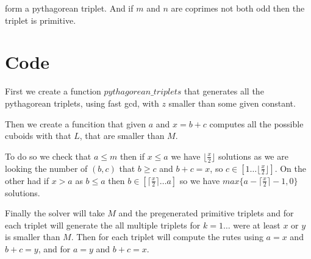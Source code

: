 \documentclass[10pt, a4paper]{article}		%
\theoremstyle{plain}
\theoremstyle{definition}
\begin{document}
form a pythagorean triplet. And if $m$ and $n$ are coprimes not both odd then the triplet is primitive.

\section{Code}

First we create a function $pythagorean\_triplets$ that generates all the pythagorean triplets, using fast gcd, with $z$ smaller than some given constant.

Then we create a funcition that given $a$ and $x = b + c$ computes all the possible cuboids with that $L$, that are smaller than $M$.

To do so we check that $a \leq m$ then if $x \leq a$ we have $\lfloor\frac{x}{2}\rfloor$ solutions as we are looking the number of $(b,c)$ that $b \geq c$ and $b+c = x$, so $c \in [1 \dots \lfloor\frac{x}{2}\rfloor]$.
On the other had if $x > a$ as $b \leq a$ then $b \in [\lceil\frac{x}{2}\rceil \dots a]$ so we have $max\{a - \lceil\frac{x}{2}\rceil - 1, 0\}$ solutions.

Finally the solver will take $M$ and the pregenerated primitive triplets and for each triplet will generate the all multiple triplets for $k = 1\dots$ were at least $x$ or $y$ is smaller than $M$.
Then for each triplet will compute the rutes using $a = x$ and $b + c = y$, and for $a = y$ and $b + c = x$.
\end{document}

